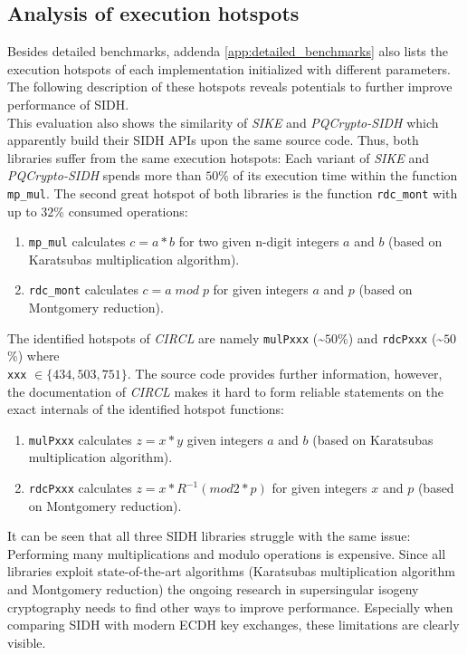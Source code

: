 \subsection{Analysis of execution hotspots}\label{sec:analysis_sidh_hotspots}
Besides detailed benchmarks, addenda \ref{app:detailed_benchmarks} also lists the execution hotspots of each implementation initialized with different parameters. The following description of these hotspots reveals potentials to further improve performance of \gls{SIDH}.\\
This evaluation also shows the similarity of \textit{\gls{SIKE}} and \textit{ \gls{PQCrypto-SIDH}} which apparently build their \gls{SIDH} APIs upon the same source code. Thus, both libraries suffer from the same execution hotspots: Each variant of \textit{\gls{SIKE}} and \textit{ \gls{PQCrypto-SIDH}} spends more than $50$\% of its execution time within the function \texttt{mp\_mul}. The second great hotspot of both libraries is the function \texttt{rdc\_mont} with up to $32$\% consumed operations:
\begin{enumerate}
\item \texttt{mp\_mul} calculates $c=a*b$ for two given n-digit integers $a$ and $b$ (based on Karatsubas multiplication algorithm).
\item \texttt{rdc\_mont} calculates $c = a\;mod\;p$ for given integers $a$ and $p$ (based on Montgomery reduction).
\end{enumerate}
The identified hotspots of \textit{\gls{CIRCL}} are namely \texttt{mulPxxx} (\textasciitilde $50$\%) and \texttt{rdcPxxx} (\textasciitilde $50$\%) where \\\texttt{xxx} $\in \{434, 503, 751\}$. The source code provides further information, however, the documentation of \textit{\gls{CIRCL}} makes it hard to form reliable statements on the exact internals of the identified hotspot functions:
\begin{enumerate}
\item \texttt{mulPxxx} calculates $z=x*y$ given integers $a$ and $b$ (based on Karatsubas multiplication algorithm).
\item \texttt{rdcPxxx} calculates $z = x*R^{-1} (mod 2*p)$ for given integers $x$ and $p$ (based on Montgomery reduction).
\end{enumerate}
It can be seen that all three \gls{SIDH} libraries struggle with the same issue: Performing many multiplications and modulo operations is expensive. Since all libraries exploit state-of-the-art algorithms (Karatsubas multiplication algorithm and Montgomery reduction) the ongoing research in supersingular isogeny cryptography needs to find other ways to improve performance. Especially when comparing \gls{SIDH} with modern \gls{ECDH} key exchanges, these limitations are clearly visible.

